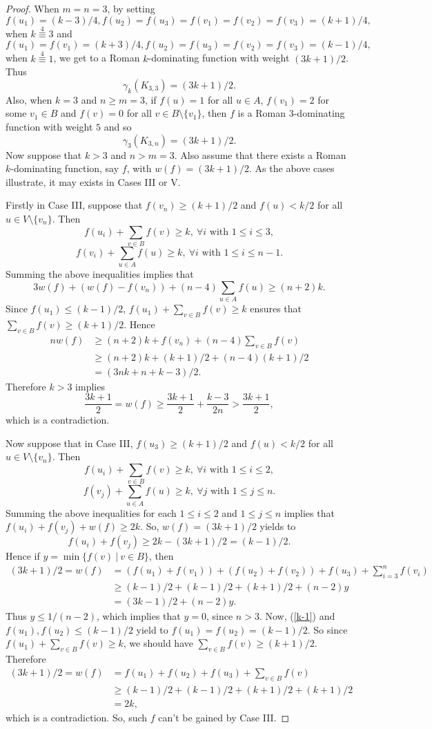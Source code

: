 \documentclass[10pt,a4paper]{amsart}
\begin{document}
\begin{proof}
When $m=n=3$, by setting
 $$f(u_1)=(k-3)/4, f(u_2)=f(u_3)=f(v_1)=f(v_2)=f(v_3)=(k+1)/4,$$
 when $k\overset{4}{\equiv} 3$  and 
$$f(u_1)=f(v_1)=(k+3)/4, f(u_2)=f(u_3)=f(v_2)=f(v_3)=(k-1)/4,$$
 when $k\overset{4}{\equiv}1$,  we get to a Roman $k$-dominating function with weight $(3k+1)/2$. Thus 
$$\gamma_k(K_{3,3})=(3k+1)/2.$$
Also, when $k=3$ and $n\geq m=3$, if $f(u)=1$ for all $u\in A$, $f(v_1)=2$ for some $v_1\in B$ and $f(v)=0$ for all $v\in B\setminus \{v_1\}$, then $f$ is a Roman $3$-dominating function with weight $5$ and so 
$$\gamma_3(K_{3,n})=(3k+1)/2.$$
Now suppose that $k>3$ and $n>m=3$. Also assume that there exists a Roman $k$-dominating function, say $f$, with $w(f)=(3k+1)/2$. As the above cases illustrate, it may exists in Cases III or V. 

Firstly in Case III, suppose that $f(v_n)\geq (k+1)/2$ and $f(u)<k/2$ for all $u\in V\setminus \{v_n\}$. Then
$$f(u_i)+\sum_{v\in B}f(v)\geq k, \ \forall i \textrm{ with }   1\leq i \leq 3, $$
$$f(v_i)+\sum_{u\in A}f(u)\geq k, \ \forall i \textrm{ with }   1\leq i \leq n-1.$$
Summing the above inequalities implies that
$$3w(f)+(w(f)-f(v_n))+(n-4)\sum_{u\in A}f(u)\geq (n+2)k.$$
Since $f(u_1)\leq (k-1)/2$, $f(u_1)+\sum_{v\in B}f(v)\geq k$ ensures that $\sum_{v\in B}f(v)\geq (k+1)/2$. Hence
\begin{align*}
nw(f)&\geq (n+2)k+f(v_n)+(n-4)\sum_{v\in B}f(v)\\
&\geq (n+2)k+(k+1)/2+(n-4)(k+1)/2\\
&=(3nk+n+k-3)/2.
\end{align*}
Therefore $k>3$ implies
$$\frac{3k+1}{2}=w(f)\geq \frac{3k+1}{2}+\frac{k-3}{2n}> \frac{3k+1}{2},$$
which is a contradiction.

Now suppose that in Case III, $f(u_3)\geq (k+1)/2$ and $f(u)<k/2$ for all $u\in V\setminus \{v_n\}$. Then
$$f(u_i)+\sum_{v\in B}f(v)\geq k, \ \forall i \textrm{ with }   1\leq i \leq 2, $$
$$f(v_j)+\sum_{u\in A}f(u)\geq k, \ \forall j \textrm{ with }   1\leq j \leq n.$$
Summing the above inequalities for each $1\leq i \leq 2$ and $1\leq j \leq n$ implies that $f(u_i)+f(v_j)+w(f)\geq 2k$. So, $w(f)=(3k+1)/2$ yields to
\begin{equation}\label{k-1}
f(u_i)+f(v_j)\geq 2k-(3k+1)/2=(k-1)/2. 
\end{equation}
Hence if $y=\min\{f(v) \ | \ v\in B\}$, then
\begin{align*}
(3k+1)/2=w(f)&=(f(u_1)+f(v_1))+(f(u_2)+f(v_2))+f(u_3)+\sum_{i=3}^nf(v_i)\\
&\geq (k-1)/2+(k-1)/2+(k+1)/2+(n-2)y\\
&=(3k-1)/2+(n-2)y.
\end{align*}
Thus $y\leq 1/(n-2)$, which implies that $y=0$, since $n>3$. Now, (\ref{k-1}) and $f(u_1), f(u_2)\leq (k-1)/2$ yield to $f(u_1)=f(u_2)=(k-1)/2$. So since $f(u_1)+\sum_{v\in B}f(v)\geq k$, we should have $\sum_{v\in B}f(v)\geq (k+1)/2$. Therefore
\begin{align*}
(3k+1)/2=w(f)&=f(u_1)+f(u_2)+f(u_3)+\sum_{v\in B}f(v)\\
&\geq (k-1)/2+(k-1)/2+(k+1)/2+(k+1)/2\\
&=2k,
\end{align*}
which is a contradiction. So, such $f$ can't be gained by Case III.


\end{proof}
\end{document}
